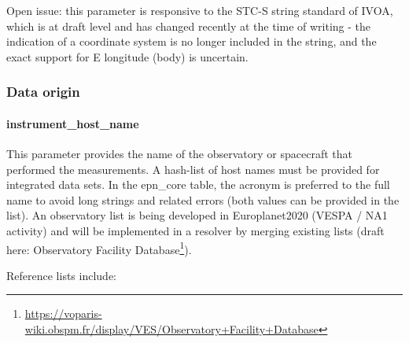 \documentclass[11pt,a4paper]{ivoa}
\begin{document}
Open issue: this parameter is responsive to the STC-S string standard of IVOA, which is at draft level and has changed recently at the time of writing - the indication of a coordinate system is no longer included in the string, and the exact support for E longitude (body) is uncertain.

\subsubsection{Data origin}

\paragraph{instrument\_host\_name}

This parameter provides the name of the observatory or spacecraft that performed the measurements. A hash-list of host names must be provided for integrated data sets. In the epn\_core table, the acronym is preferred to the full name to avoid long strings and related errors (both values can be provided in the list). An observatory list is being developed in Europlanet2020 (VESPA / NA1 activity) and will be implemented in a resolver by merging existing lists (draft here: Observatory Facility Database\footnote{\url{https://voparis-wiki.obspm.fr/display/VES/Observatory+Facility+Database}}).

Reference lists include:
\end{document}
